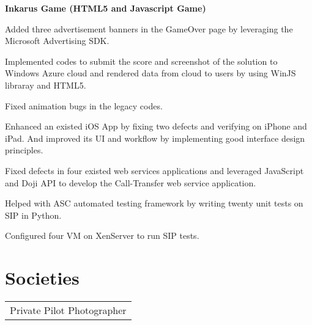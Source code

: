 \documentclass[letterpaper]{lyu-resume} %
\begin{document}
\begin{minipage}[t]{0.66\textwidth}
\vspace{2 mm}
\textbf{Inkarus Game (HTML5 and Javascript Game)}
\begin{tightitemize}
\item Added three advertisement banners in the GameOver page by leveraging the Microsoft Advertising SDK.
\item Implemented codes to submit the score and screenshot of the solution to Windows Azure cloud and rendered data from cloud to users by using WinJS libraray and HTML5.
\item Fixed animation bugs in the legacy codes.
\end{tightitemize}

\sectionspace %



\begin{tightitemize}
\item Enhanced an existed iOS App by fixing two defects and verifying on iPhone and iPad. And improved its UI and workflow by implementing good interface design principles.
\item Fixed defects in four existed web services applications and leveraged JavaScript and Doji API to develop the Call-Transfer web service application. 
\item Helped with ASC automated testing framework by writing twenty unit tests on SIP in Python.
\item Configured four VM on XenServer to run SIP tests.
\end{tightitemize}

\sectionspace %


\section{Societies} 

\begin{tabular}{l}

\textbullet{} Private Pilot \textbullet{} Photographer
\end{tabular}

\sectionspace %


\end{minipage} %
\end{document}
